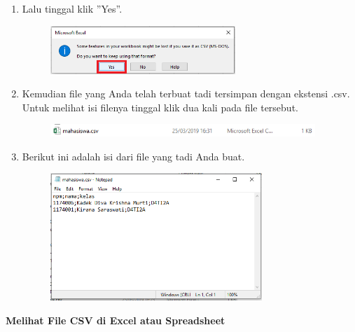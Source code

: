 \begin{enumerate}
	\item Lalu tinggal klik ''Yes''.
	
	\begin{figure}[H]
		\includegraphics[width=7cm]{figures/4/1174006/Teori/t6.png}
		\centering
	\end{figure}
	
	\item Kemudian file yang Anda telah terbuat tadi tersimpan dengan ekstensi .csv. Untuk melihat isi filenya tinggal klik dua kali pada file tersebut.
	
	\begin{figure}[H]
		\includegraphics[width=10cm]{figures/4/1174006/Teori/t8.png}
		\centering
	\end{figure}
	
	\item Berikut ini adalah isi dari file yang tadi Anda buat.
	
	\begin{figure}[H]
		\includegraphics[width=8cm]{figures/4/1174006/Teori/t7.png}
		\centering
	\end{figure}
\end{enumerate}

\textbf{Melihat File CSV di Excel atau Spreadsheet}

